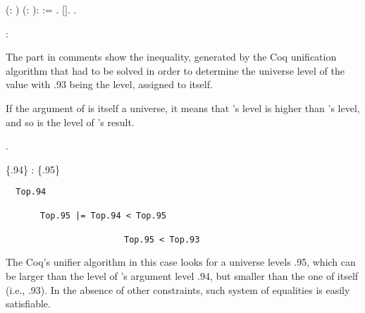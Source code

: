 \begin{coqdoccode}
\coqdocemptyline
\coqdocnoindent
{}  (: ) (: ):  := .\coqdoceol
\coqdocnoindent
{}  [].\coqdoceol
\coqdocemptyline
\coqdocnoindent
{}  .\coqdoceol
\coqdocemptyline
\end{coqdoccode}


\coqdoceol
\coqdocemptyline
\coqdocnoindent
{} \coqdoceol
\coqdocindent{2.50em}
: 

\coqdocemptyline

\texttt{}



The part in comments show the inequality, generated by the Coq
unification algorithm that had to be solved in order to determine the
universe level of the value   with .93 being the level,
assigned to  itself.






If the argument of  is itself a universe, it means that 's
level is higher than 's level, and so is the level of 's result.


\begin{coqdoccode}
\coqdocemptyline
\coqdocnoindent
{}  .\coqdoceol
\coqdocemptyline
\end{coqdoccode}


\coqdoceol
\coqdocemptyline
\coqdocnoindent
{} \{.94\}\coqdoceol
\coqdocindent{2.50em}
: \{.95\}

\coqdocemptyline

\texttt{\coqcl~ Top.94}

~~~~~~~\texttt{Top.95 |= Top.94 < Top.95}

~~~~~~~~~~~~~~~~~~~~~~~~\texttt{Top.95 < Top.93 ~\coqcr}



The Coq's unifier algorithm in this case looks for a universe levels
.95, which can be larger than the level of 's argument level
.94, but smaller than the one of  itself (i.e., .93). In
the absence of other constraints, such system of equalities is easily
satisfiable.


